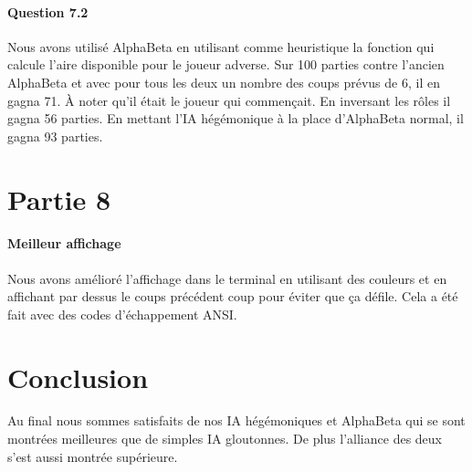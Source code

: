 \documentclass[a4paper]{article}
\begin{document}
    \paragraph{Question 7.2} Nous avons utilisé AlphaBeta en utilisant comme
    heuristique la fonction qui calcule l'aire disponible pour le joueur
    adverse. Sur 100 parties contre l'ancien AlphaBeta et avec pour tous les
    deux un nombre des coups prévus de 6, il en gagna 71. À noter qu'il était
    le joueur qui commençait. En inversant les rôles il gagna 56 parties.
    En mettant l'IA hégémonique à la place d'AlphaBeta normal, il gagna 93
    parties.


    \section{Partie 8}
    \paragraph{Meilleur affichage} Nous avons amélioré l'affichage dans le
    terminal en utilisant des couleurs et en affichant par dessus le coups
    précédent coup pour éviter que ça défile. Cela a été fait avec des codes
    d'échappement ANSI.

    \section{Conclusion}
    Au final nous sommes satisfaits de nos IA hégémoniques et AlphaBeta qui se 
    sont montrées meilleures que de simples IA gloutonnes. De plus l'alliance 
    des deux s'est aussi montrée supérieure.
\end{document}
